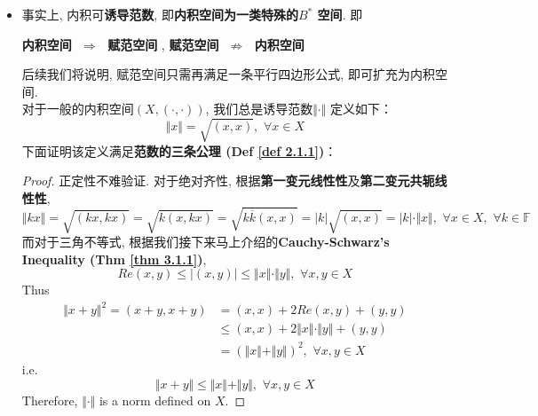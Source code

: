 \begin{defn}
\begin{rmk}
\begin{itemize}
				\begin{proof}
					根据\textbf{共轭对称性}及\textbf{第一变元线性性}, $\forall x , y_1 , y_2 \in X , \,\, \forall \alpha , \beta \in \mathbb{F}$, 
					\[
						(x , \alpha y_1 + \beta y_2) 
						= \overline{(\alpha y_1 + \beta y_2 , x)} 
						= \overline{\alpha} \overline{(y_1  ,x)} + \overline{\beta} \overline{(y_2 , x)} 
						= \overline{\alpha} (x , y_1) + \overline{\beta} (x , y_2)
					\]
				\end{proof}
				
				\vspace{4em}
				
				\item 事实上, 内积可\textbf{诱导范数}, 即\textbf{内积空间为一类特殊的$B^*$ 空间}. 即
				\begin{center}
					\textbf{内积空间} $\,\, \Rightarrow \,\,$ \textbf{赋范空间} \hspace*{1em} , \hspace*{1em} \textbf{赋范空间} $\,\, \not\Rightarrow \,\,$ \textbf{内积空间}
				\end{center}
				后续我们将说明, 赋范空间只需再满足一条平行四边形公式, 即可扩充为内积空间. \\
				对于一般的内积空间$(X , (\cdot , \cdot))$, 我们总是诱导范数$\Vert \cdot \Vert$ 定义如下：
				\[ \Vert x \Vert = \sqrt{(x , x)} , \,\, \forall x \in X \]
				下面证明该定义满足\textbf{范数的三条公理 (Def \ref{def 2.1.1})}：
				
				\vspace{6em}
				
				\begin{proof}
					正定性不难验证. 对于绝对齐性, 根据\textbf{第一变元线性性}及\textbf{第二变元共轭线性性}, 
					\[ \Vert k x \Vert 
					= \sqrt{(k x , kx)} 
					= \sqrt{k(x , kx)} 
					= \sqrt{k \overline{k} (x , x)} 
					= \left| k \right| \sqrt{(x , x)} 
					= \left| k \right| \cdot \Vert x \Vert , \,\, \forall x \in X , \,\, \forall k \in \mathbb{F} \]
					而对于三角不等式, 根据我们接下来马上介绍的\textbf{Cauchy-Schwarz's Inequality (Thm \ref{thm 3.1.1})}, 
					\[ Re (x , y) \leq \Big| (x , y) \Big| \leq \Vert x \Vert \cdot \Vert y \Vert , \,\, \forall x , y \in X \]
					Thus
					\begin{align}
					\Vert x + y \Vert^2 
					= (x + y , x + y) 
					&= (x , x) + 2 Re(x , y) + (y , y) \\
					&\leq (x , x) + 2 \Vert x \Vert \cdot \Vert y \Vert + (y , y) \\
					&= \left( \Vert x \Vert + \Vert y \Vert \right)^2 , \,\, \forall x , y \in X 
					\end{align}
					i.e. 
					\[ \Vert x + y \Vert \leq \Vert x \Vert + \Vert y \Vert , \,\, \forall x , y \in X \]
					Therefore, $\Vert \cdot \Vert$ is a norm defined on $X$.
				\end{proof}
			\end{itemize}
		\end{rmk}
	\end{defn}

